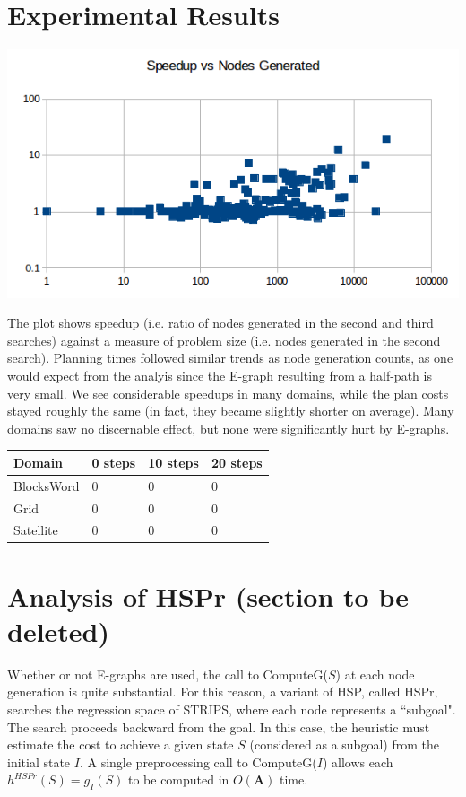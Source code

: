 \documentclass[letterpaper]{article}
\begin{document}
\section{Experimental Results}

\includegraphics[scale=0.4]{AIPlot.png}

The plot shows speedup (i.e. ratio of nodes generated in the second and third searches) against a measure of problem size (i.e. nodes generated in the second search). Planning times followed similar trends as node generation counts, as one would expect from the analyis since the E-graph resulting from a half-path is very small. We see considerable speedups in many domains, while the plan costs stayed roughly the same (in fact, they became slightly shorter on average). Many domains saw no discernable effect, but none were significantly hurt by E-graphs.

\begin{center}
    \begin{tabular}{| l | l | l | l |}
    \hline
    Domain & 0 steps & 10 steps & 20 steps
    \\ \hline
    BlocksWord & 0 & 0 & 0
    \\ \hline
    Grid & 0 & 0 & 0
    \\ \hline
    Satellite & 0 & 0 & 0
    \\ \hline
    \end{tabular}
\end{center}

\section{Analysis of HSPr (section to be deleted)}

Whether or not E-graphs are used, the call to ComputeG($S$) at each node generation is quite substantial. For this reason, a variant of HSP, called HSPr, searches the regression space of STRIPS, where each node represents a ``subgoal". The search proceeds backward from the goal. In this case, the heuristic must estimate the cost to achieve a given state $S$ (considered as a subgoal) from the initial state $I$. A single preprocessing call to ComputeG($I$) allows each $h^{HSPr}(S) = g_I(S)$ to be computed in $O(\mathbf{A})$ time.
\end{document}

